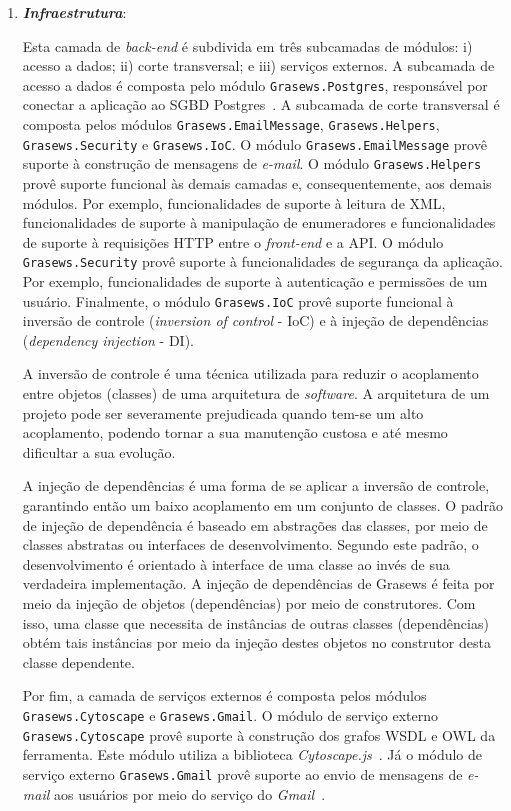 \begin{enumerate}
  \item
  \textit{\textbf{Infraestrutura}}:
  
  Esta camada de \textit{back-end} é subdivida em três subcamadas de módulos: i) acesso a dados; ii) corte transversal; e iii) serviços externos.  A subcamada de acesso a dados é composta pelo módulo \texttt{Grasews.Postgres}, responsável por conectar a aplicação ao SGBD Postgres~\cite{POSTGRES-2019}. A subcamada de corte transversal é composta pelos módulos \texttt{Grasews.EmailMessage}, \texttt{Grasews.Helpers}, \texttt{Grasews.Security} e \texttt{Grasews.IoC}. O módulo \texttt{Grasews.EmailMessage} provê suporte à construção de mensagens de \textit{e-mail}. O módulo \texttt{Grasews.Helpers} provê suporte funcional às demais camadas e, consequentemente, aos demais módulos. Por exemplo, funcionalidades de suporte à leitura de XML, funcionalidades de suporte à manipulação de enumeradores e funcionalidades de suporte à requisições HTTP entre o \textit{front-end} e a API. O módulo \texttt{Grasews.Security} provê suporte à funcionalidades de segurança da aplicação. Por exemplo, funcionalidades de suporte à autenticação e permissões de um usuário. Finalmente, o módulo \texttt{Grasews.IoC} provê suporte funcional à inversão de controle (\textit{inversion of control} - IoC) e à injeção de dependências (\textit{dependency injection} - DI).
  
  A inversão de controle é uma técnica utilizada para reduzir o acoplamento entre objetos (classes) de uma arquitetura de \textit{software}. A arquitetura de um projeto pode ser severamente prejudicada quando tem-se um alto acoplamento, podendo tornar a sua manutenção custosa e até mesmo dificultar a sua evolução.
  
  A injeção de dependências é uma forma de se aplicar a inversão de controle, garantindo então um baixo acoplamento em um conjunto de classes. O padrão de injeção de dependência é baseado em abstrações das classes, por meio de classes abstratas ou interfaces de desenvolvimento. Segundo este padrão, o desenvolvimento é orientado à interface de uma classe ao invés de sua verdadeira implementação. A injeção de dependências de Grasews é feita por meio da injeção de objetos (dependências) por meio de construtores. Com isso, uma classe que necessita de instâncias de outras classes (dependências) obtém tais instâncias por meio da injeção destes objetos no construtor desta classe dependente.
  
  Por fim, a camada de serviços externos é composta pelos módulos \texttt{Grasews.Cytoscape} e \texttt{Grasews.Gmail}. O módulo de serviço externo \texttt{Grasews.Cytoscape} provê suporte à construção dos grafos WSDL e OWL da ferramenta. Este módulo utiliza a biblioteca \textit{Cytoscape.js}~\cite{CYTOSCAPE-2015}. Já o módulo de serviço externo \texttt{Grasews.Gmail} provê suporte ao envio de mensagens de \textit{e-mail} aos usuários por meio do serviço do \textit{Gmail}~\cite{GOOGLE-2019-GMAIL}.
  
\end{enumerate}